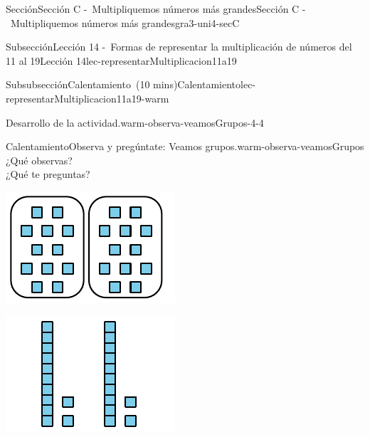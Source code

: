 \documentclass[oneside,10pt,]{article}
\begin{document}
\begin{sectionptx}{Sección}{Sección C -~Multipliquemos números más grandes}{}{Sección C -~Multipliquemos números más grandes}{}{}{gra3-uni4-secC}
\begin{subsectionptx}{Subsección}{Lección 14 -~Formas de representar la multiplicación de números del 11 al 19}{}{Lección 14}{}{}{lec-representarMultiplicacion11a19}
\begin{subsubsectionptx}{Subsubsección}{Calentamiento~(10 mins)}{}{Calentamiento}{}{}{lec-representarMultiplicacion11a19-warm}
\begin{paragraphs}{Desarrollo de la actividad.}{warm-observa-veamosGrupos-4-4}
\end{paragraphs}%
\begin{exploration}{Calentamiento}{Observa y pregúntate: Veamos grupos.}{warm-observa-veamosGrupos}%
¿Qué observas?\\
 ¿Qué te preguntas?%
\begin{sidebyside}{3}{0}{0}{0}%
\begin{sbspanel}{0.333333333333333}%
\includegraphics[width=\linewidth]{external/svg-source/tikz-file-149346-scale13.pdf}
\end{sbspanel}%
\begin{sbspanel}{0.333333333333333}%
\includegraphics[width=\linewidth]{external/svg-source/tikz-file-149347-scale13.pdf}
\end{sbspanel}%
\begin{sbspanel}{0.333333333333333}%

\end{sbspanel}
\end{sidebyside}
\end{exploration}
\end{subsubsectionptx}
\end{subsectionptx}
\end{sectionptx}
\end{document}
